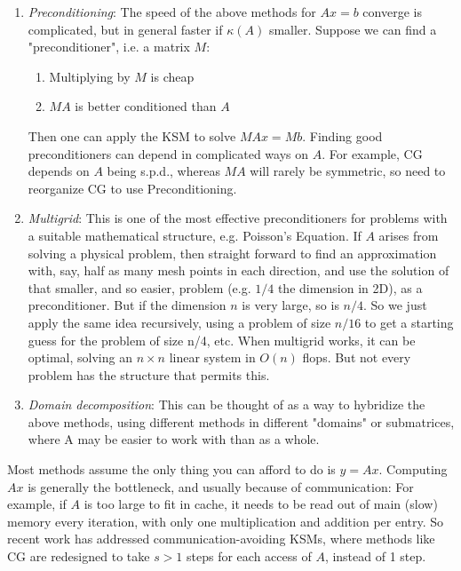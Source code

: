 \documentclass[11pt]{article}
\numberwithin{equation}{section}
\begin{document}
\begin{enumerate}
    \item \textit{Preconditioning}: The speed of the above methods for $Ax=b$ converge is complicated, but in general faster if $\kappa(A)$ smaller.
    Suppose we can find a "preconditioner", i.e. a matrix $M$:\begin{enumerate}
        \item Multiplying by $M$ is cheap
        \item $MA$ is better conditioned than $A$
    \end{enumerate}
    Then one can apply the KSM to solve $MAx=Mb$. Finding good preconditioners can depend in complicated ways on $A$.
    For example, CG depends on $A$ being s.p.d., whereas $MA$ will rarely be symmetric, so need to reorganize CG to use Preconditioning.
    \item \textit{Multigrid}:  This is one of the most effective preconditioners for problems with a suitable mathematical structure, e.g. Poisson's Equation.
    If $A$ arises from solving a physical problem, then straight forward to find an approximation with, say, half as many mesh
    points in each direction, and use the solution of that smaller, and so easier, problem (e.g. $1/4$ the dimension in 2D), as a preconditioner.
    But if the dimension $n$ is very large, so is $n/4$. So we just apply the same idea recursively, using a problem of size $n/16$ to get a starting guess
    for the problem of size n/4, etc. When multigrid works, it can be optimal, solving an $n\times n$ linear system in $O(n)$ flops. 
    But not every problem has the structure that permits this.
    \item \textit{Domain decomposition}: This can be thought of as a way to hybridize the above methods,
    using different methods in different "domains" or submatrices, where A may be easier to work with than as a whole.
\end{enumerate}

Most methods assume the only thing you can afford to do is $y=Ax$. Computing $Ax$ is generally the bottleneck, and usually because of communication:
For example, if $A$ is too large to fit in cache, it needs to be read out of main (slow) memory every iteration,
with only one multiplication and addition per entry. So recent work has addressed communication-avoiding KSMs, 
where methods like CG are redesigned to take $s>1$ steps for each access of $A$, instead of 1 step.
\end{document}

